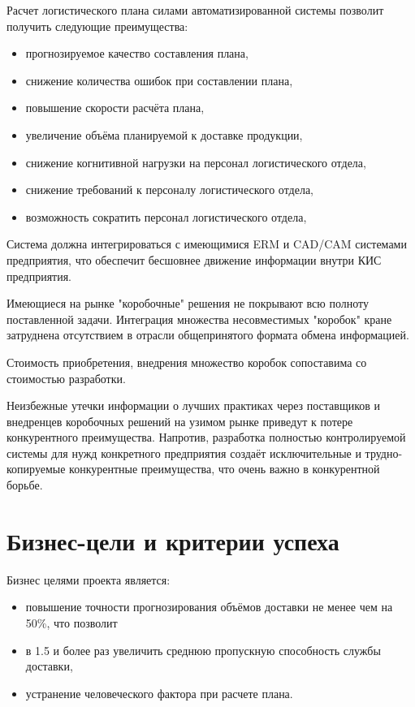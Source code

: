 Расчет логистического плана силами автоматизированной системы позволит получить следующие преимущества:
\begin{itemize}
    \item прогнозируемое качество составления плана,
    \item снижение количества ошибок при составлении плана,
    \item повышение скорости расчёта плана,
    \item увеличение объёма планируемой к доставке продукции,
    \item снижение когнитивной нагрузки на персонал логистического отдела,
    \item снижение требований к персоналу логистического отдела,
    \item возможность сократить персонал логистического отдела,
\end{itemize}

Система должна интегрироваться с имеющимися ERM и CAD/CAM системами предприятия, что обеспечит бесшовнее движение информации внутри КИС предприятия.

Имеющиеся на рынке "коробочные" решения не покрывают всю полноту поставленной задачи.
Интеграция множества несовместимых "коробок" кране затруднена отсутствием в отрасли общепринятого формата обмена информацией.

Стоимость приобретения, внедрения множество коробок сопоставима со стоимостью разработки.

Неизбежные утечки информации о лучших практиках через поставщиков и внедренцев коробочных решений на узимом рынке приведут к потере конкурентного преимущества.
Напротив, разработка полностью контролируемой системы для нужд конкретного предприятия создаёт исключительные и трудно-копируемые конкурентные преимущества, что очень важно в конкурентной борьбе.


\section{Бизнес-цели и критерии успеха}
\label{sec:goals}

Бизнес целями проекта является:
\begin{itemize}
    \item повышение точности прогнозирования объёмов доставки не менее чем на 50\%, что позволит
    \item в 1.5 и более раз увеличить среднюю пропускную способность службы доставки,
    \item устранение человеческого фактора при расчете плана.
\end{itemize}


